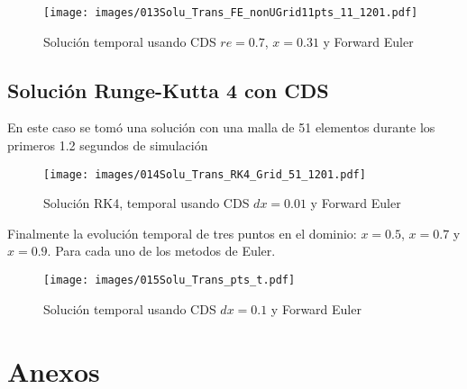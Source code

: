 \documentclass[9pt,technote,twoside,letterpaper,onecolumn]{IEEEtran}
\begin{document}
\begin{multicols}{2}
\begin{figure}[H]
  \centering
  \texttt{[image: images/013Solu\_Trans\_FE\_nonUGrid11pts\_11\_1201.pdf]}
  \caption{Solución temporal usando CDS $re=0.7$, $x=0.31$ y Forward Euler}
  \label{fig:trans_sol_non-cds_dx01}
\end{figure}

\subsection{Solución Runge-Kutta 4 con CDS}
\label{sec:sol_ucds_rk4_noncds}

En este caso se tomó una solución con una malla de 51 elementos durante los primeros 1.2 segundos de simulación
\begin{figure}[H]
  \centering
  \texttt{[image: images/014Solu\_Trans\_RK4\_Grid\_51\_1201.pdf]}
  \caption{Solución RK4, temporal usando CDS $dx=0.01$ y Forward Euler}
  \label{fig:trans_sol_rk4-cds_dx01}
\end{figure}

Finalmente la evolución temporal de tres puntos en el dominio: $x=0.5$, $x=0.7$ y $x=0.9$. Para cada uno de los metodos de Euler.
\begin{figure}[H]
  \centering
  \texttt{[image: images/015Solu\_Trans\_pts\_t.pdf]}
  \caption{Solución temporal usando CDS $dx=0.1$ y Forward Euler}
  \label{fig:trans_sol_pts_time_evol}
\end{figure}



\end{multicols}

\newpage
\section{Anexos}
\label{sec:anexos}
\end{document}
